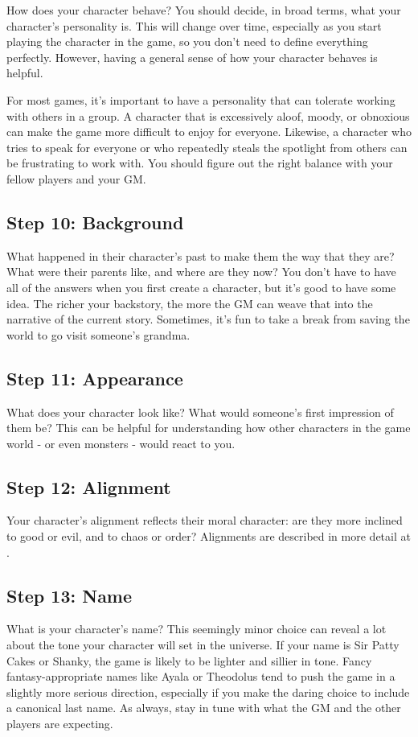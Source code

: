         How does your character behave?
        You should decide, in broad terms, what your character's personality is.
        This will change over time, especially as you start playing the character in the game, so you don't need to define everything perfectly.
        However, having a general sense of how your character behaves is helpful.

        For most games, it's important to have a personality that can tolerate working with others in a group.
        A character that is excessively aloof, moody, or obnoxious can make the game more difficult to enjoy for everyone.
        Likewise, a character who tries to speak for everyone or who repeatedly steals the spotlight from others can be frustrating to work with.
        You should figure out the right balance with your fellow players and your GM.\@

    \subsection{Step 10: Background}
        What happened in their character's past to make them the way that they are?
        What were their parents like, and where are they now?
        You don't have to have all of the answers when you first create a character, but it's good to have some idea.
        The richer your backstory, the more the GM can weave that into the narrative of the current story.
        Sometimes, it's fun to take a break from saving the world to go visit someone's grandma.

    \subsection{Step 11: Appearance}
        What does your character look like?
        What would someone's first impression of them be?
        This can be helpful for understanding how other characters in the game world - or even monsters - would react to you.

    \subsection{Step 12: Alignment}
        Your character's alignment reflects their moral character: are they more inclined to good or evil, and to chaos or order?
        Alignments are described in more detail at .

    \subsection{Step 13: Name}
        What is your character's name?
        This seemingly minor choice can reveal a lot about the tone your character will set in the universe.
        If your name is Sir Patty Cakes or Shanky, the game is likely to be lighter and sillier in tone.
        Fancy fantasy-appropriate names like Ayala or Theodolus tend to push the game in a slightly more serious direction, especially if you make the daring choice to include a canonical last name.
        As always, stay in tune with what the GM and the other players are expecting.


